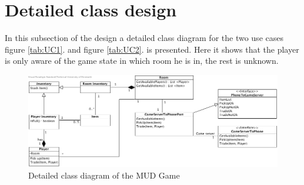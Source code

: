 \section{Detailed class design}
In this subsection of the design a detailed class diagram for the two use cases figure \ref{tab:UC1}. and figure \ref{tab:UC2}. is presented. Here it shows that the player is only aware of the game state in which room he is in, the rest is unknown.

\begin{figure}[!ht]
  \begin{center}
    \includegraphics[width=1\textwidth]{figures/class_diagram.jpg} 
  \end{center}
  \caption{Detailed class diagram of the MUD Game}
  \label{fig:class-diagram}
\end{figure}
